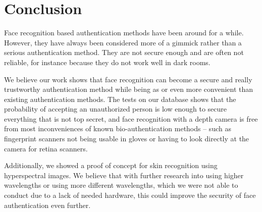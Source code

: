 \chapter{Conclusion}
    Face recognition based authentication methods have been around for a while. However,
    they have always been considered more of a gimmick rather than a serious
    authentication method. They are not secure enough and are often not reliable,
    for instance because they do not work well in dark rooms.

    We believe our work shows that face recognition can become a secure and
    really trustworthy authentication method while being as or even more
    convenient than existing authentication methods.
    The tests on our database shows that the probability of accepting
    an unauthorized person is low enough to secure everything that is not top secret,
    and face recognition with a depth camera is free from most inconveniences
    of known bio-authentication methods -- such as fingerprint scanners not
    being usable in gloves or having to look directly at the camera for
    retina scanners.

    Additionally, we showed a proof of concept for skin recognition using
    hyperspectral images. We believe that with further research into
    using higher wavelengths or using more different wavelengths,
    which we were not able to conduct due to a lack of needed hardware,
    this could improve the security of face authentication even further.
